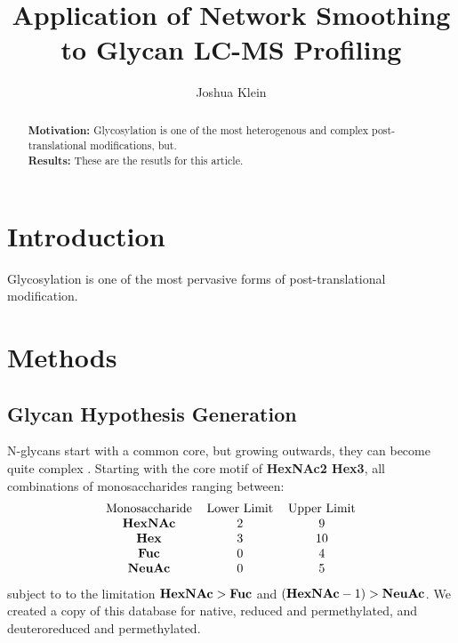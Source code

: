 \documentclass{article}
\begin{document}
\newcommand{\monosaccharide}[1]{{\bf #1}}

\title{Application of Network Smoothing to Glycan LC-MS Profiling}
\author{Joshua Klein}
\begin{abstract}
    \textbf{Motivation:} Glycosylation is one of the most heterogenous
    and complex post-translational modifications, but.\\
    \textbf{Results:} These are the resutls for this article.\\
\end{abstract}

\maketitle

\section{Introduction}
Glycosylation is one of the most pervasive forms of post-translational
modification.


\section{Methods}

\subsection{Glycan Hypothesis Generation}
N-glycans start with a common core, but growing outwards, they can become quite
complex \cite{Stanley2009}. Starting with the core motif of {\bf HexNAc2 Hex3}, all
combinations of monosaccharides ranging between:$$
\begin{tabular}{c c c}
    Monosaccharide & Lower Limit & Upper Limit \\
    \monosaccharide{HexNAc} & 2 & 9 \\
    \monosaccharide{Hex} & 3 & 10 \\
    \monosaccharide{Fuc} & 0 & 4 \\
    \monosaccharide{NeuAc} & 0 & 5 \\
\end{tabular}
$$subject to to the limitation $\monosaccharide{HexNAc} > \monosaccharide{Fuc}$ and $(\monosaccharide{HexNAc} - 1) > 
\monosaccharide{NeuAc}$. We created a copy of this database for native, reduced and permethylated,
and deuteroreduced and permethylated.
\end{document}
